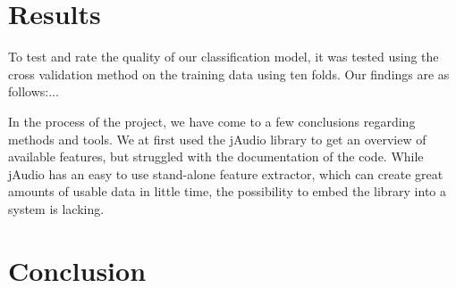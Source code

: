 \begin{multicols}{2}

\section{Results}
To test and rate the quality of our classification model, it was tested using the cross validation method on the training data using ten folds. Our findings are as follows:...


In the process of the project, we have come to a few conclusions regarding methods and tools. We at first used the jAudio library to get an overview of available features, but struggled with the documentation of the code. While jAudio has an easy to use stand-alone feature extractor, which can create great amounts of usable data in little time, the possibility to embed the library into a system is lacking.
\\
\section{Conclusion}





\end{multicols}

